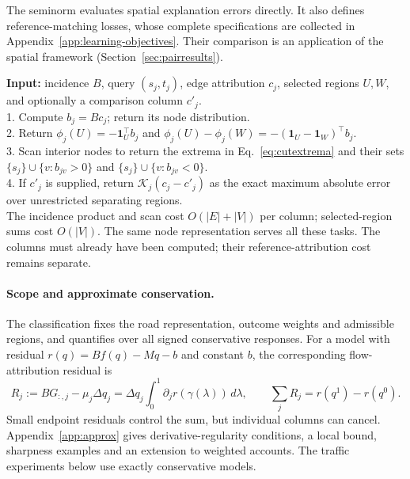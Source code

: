 \documentclass[a4paper,fleqn]{cas-sc}
\begin{document}
The seminorm evaluates spatial explanation errors directly. It also defines
reference-matching losses, whose complete specifications are collected in
Appendix~\ref{app:learning-objectives}. Their comparison is an application
of the spatial framework (Section~\ref{sec:pairresults}).

\begin{algo}[t]
\caption{Spatial accounts from an attribution column}\label{alg:spatial}
\small
\textbf{Input:} incidence $B$, query $(s_j,t_j)$, edge attribution $c_j$,
selected regions $U,W$, and optionally a comparison column $c'_j$.\\
1. Compute $b_j=Bc_j$; return its node distribution.\\
2. Return $\phi_j(U)=-\mathbf1_U^\top b_j$ and
$\phi_j(U)-\phi_j(W)=-(\mathbf1_U-\mathbf1_W)^\top b_j$.\\
3. Scan interior nodes to return the extrema in Eq.~\eqref{eq:cutextrema}
and their sets $\{s_j\}\cup\{v:b_{jv}>0\}$ and
$\{s_j\}\cup\{v:b_{jv}<0\}$.\\
4. If $c'_j$ is supplied, return $\mathcal K_j(c_j-c'_j)$ as the exact
maximum absolute error over unrestricted separating regions.\\
The incidence product and scan cost $O(|E|+|V|)$ per column; selected-region
sums cost $O(|V|)$. The same node representation serves all these tasks. The columns must already
have been computed; their reference-attribution cost remains separate.
\end{algo}



\paragraph{Scope and approximate conservation.}\label{sec:noninheritance}
The classification fixes the road representation, outcome weights and
admissible regions, and quantifies over all signed conservative responses.
For a model with residual $r(q)=Bf(q)-Mq-b$ and constant $b$, the corresponding
flow-attribution residual is
\begin{equation}
R_j:=BG_{:,j}-\mu_j\Delta q_j
=\Delta q_j\int_0^1\partial_jr(\gamma(\lambda))\,d\lambda,
\qquad \sum_jR_j=r(q^1)-r(q^0).
\label{eq:residualidentity}
\end{equation}
Small endpoint residuals control the sum, but individual columns can cancel.
Appendix~\ref{app:approx} gives derivative-regularity conditions, a local
bound, sharpness examples and an extension to weighted accounts. The traffic
experiments below use exactly conservative models.
\end{document}
